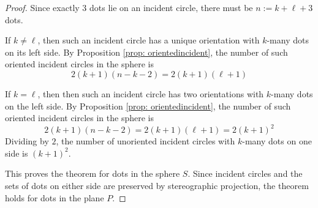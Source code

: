 \documentclass[11pt,oneside]{amsart}
\theoremstyle{definition}
\theoremstyle{remark}
\numberwithin{equation}{section}
\begin{document}
\begin{proof}
Since exactly 3 dots lie on an incident circle, there must be $n:=k+\ell+3$ dots. %

If $k\neq \ell$, then such an incident circle has a unique orientation with $k$-many dots on its left side. By Proposition \ref{prop: orientedincident}, the number of such oriented incident circles in the sphere is 
\[
2(k+1)(n-k-2) = 2(k+1)(\ell+1)
\]

If $k=\ell$, then then such an incident circle has two orientations with $k$-many dots on the left side. By Proposition \ref{prop: orientedincident}, the number of such oriented incident circles in the sphere is 
\[
2(k+1)(n-k-2) = 2(k+1)(\ell+1)= 2(k+1)^2
\]
Dividing by $2$, the number of unoriented incident circles with $k$-many dots on one side is $(k+1)^2$.

This proves the theorem for dots in the sphere $S$.
Since incident circles and the sets of dots on either side are preserved by stereographic projection, the theorem holds for dots in the plane $P$.
\end{proof}
\end{document}
